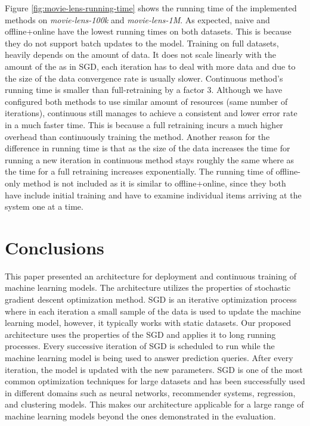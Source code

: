 \documentclass{sig-alternate-05-2015}
\begin{document}
Figure \ref{fig:movie-lens-running-time} shows the running time of the implemented methods on \textit{movie-lens-100k} and \textit{movie-lens-1M}.
As expected, naive and offline+online have the lowest running times on both datasets.
This is because they do not support batch updates to the model.
Training on full datasets, heavily depends on the amount of data.
It does not scale linearly with the amount of the as in SGD, each iteration has to deal with more data and due to the size of the data convergence rate is usually slower.
Continuous method's running time is smaller than full-retraining by a factor 3.
Although we have configured both methods to use similar amount of resources (same number of iterations), continuous still manages to achieve a consistent and lower error rate in a much faster time.
This is because a full retraining incurs a much higher overhead than continuously training the method.
Another reason for the difference in running time is that as the size of the data increases the time for running a new iteration in continuous method stays roughly the same where as the time for a full retraining increases exponentially.
The running time of offline-only method is not included as it is similar to offline+online, since they both have include initial training and have to examine individual items arriving at the system one at a time.

\section{Conclusions} \label{conclusion}
This paper presented an architecture for deployment and continuous training of machine learning models. 
The architecture utilizes the properties of stochastic gradient descent optimization method.
SGD is an iterative optimization process where in each iteration a small sample of the data is used to update the machine learning model, however, it typically works with static datasets.
Our proposed architecture uses the properties of the SGD and applies it to long running processes.
Every successive iteration of SGD is scheduled to run while the machine learning model is being used to answer prediction queries.
After every iteration, the model is updated with the new parameters.
SGD is one of the most common optimization techniques for large datasets and has been successfully used in different domains such as neural networks, recommender systems, regression, and clustering models. This makes our architecture applicable for a large range of machine learning models beyond the ones demonstrated in the evaluation.
\end{document}
